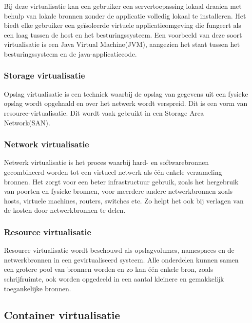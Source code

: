 Bij deze virtualisatie kan een gebruiker een servertoepassing lokaal draaien met behulp van lokale bronnen zonder de applicatie volledig lokaal te installeren. Het biedt elke gebruiker een geïsoleerde virtuele applicatieomgeving die fungeert als een laag tussen de host en het besturingssysteem. Een voorbeeld van deze soort virtualisatie is een Java Virtual Machine(JVM), aangezien het staat tussen het besturingssysteem en de java-applicatiecode. \autocite{Kedia2013} 

\subsubsection{Storage virtualisatie}

Opslag virtualisatie is een techniek waarbij de opslag van gegevens uit een fysieke opslag wordt opgehaald en over het netwerk wordt verspreid. Dit is een vorm van resource-virtualisatie. Dit wordt vaak gebruikt in een Storage Area Network(SAN). \autocite{Kedia2013}

\subsubsection{Network virtualisatie}

Netwerk virtualisatie is het proces waarbij hard- en softwarebronnen gecombineerd worden tot een virtueel netwerk als één enkele verzameling bronnen. Het zorgt voor een beter infrastructuur gebruik, zoals het hergebruik van poorten en fysieke bronnen, voor meerdere andere netwerkbronnen zoals hosts, virtuele machines, routers, switches etc. Zo helpt het ook bij verlagen van de kosten door netwerkbronnen te delen. \autocite{Kedia2013}

\subsubsection{Resource virtualisatie}

Resource virtualisatie wordt beschouwd als opslagvolumes, namespaces en de netwerkbronnen in een gevirtualiseerd systeem. Alle onderdelen kunnen samen een grotere pool van bronnen worden en zo kan één enkele bron, zoals schrijfruimte, ook worden opgedeeld in een aantal kleinere en gemakkelijk toegankelijke bronnen. \autocite{Kedia2013}

\subsection{Container virtualisatie}

